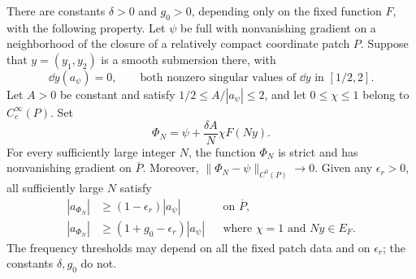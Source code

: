 \begin{lemma}
\label{lem:radial-corrugation}
There are constants $\delta>0$ and $g_0>0$, depending only on the fixed
function $F$, with the following property.  Let $\psi$ be full with
nonvanishing gradient on a neighborhood of the closure of a relatively
compact coordinate patch $P$.  Suppose that
$y=(y_1,y_2)$ is a smooth submersion there, with
\[
 \dd y(a_\psi)=0,
 \qquad\text{both nonzero singular values of }\dd y
       \text{ in }[1/2,2].
\]
Let $A>0$ be constant and satisfy $1/2\le A/|a_\psi|\le2$, and let
$0\le\chi\le1$ belong to $C_c^\infty(P)$.  Set
\[
 \Phi_N=\psi+\frac{\delta A}{N}\chi F(Ny).
\]
For every sufficiently large integer $N$, the function $\Phi_N$ is strict
and has nonvanishing gradient on $\overline P$.  Moreover,
$\|\Phi_N-\psi\|_{C^0(P)}\to0$.  Given any $\epsilon_r>0$, all
sufficiently large $N$ satisfy
\begin{align}
 |a_{\Phi_N}|&\ge(1-\epsilon_r)|a_\psi|
                      &&\text{on }\overline P,\label{eq:radial-no-loss}\\
 |a_{\Phi_N}|&\ge(1+g_0-\epsilon_r)|a_\psi|
                      &&\text{where }\chi=1\text{ and }Ny\in E_F.
                      \label{eq:radial-gain}
\end{align}
The frequency thresholds may depend on all the fixed patch data and on
$\epsilon_r$; the constants $\delta,g_0$ do not.
\end{lemma}

